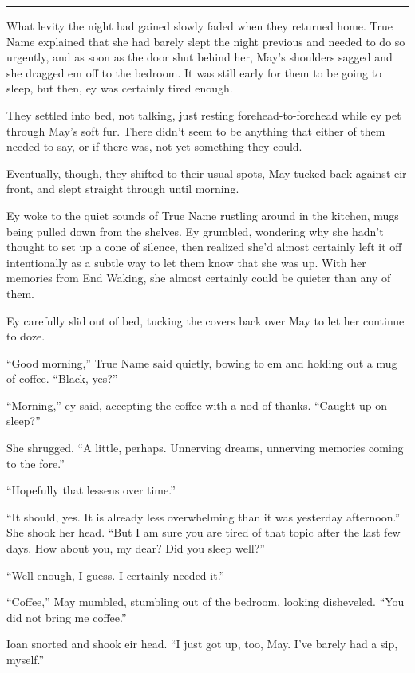 \begin{center}\rule{0.5\linewidth}{0.5pt}\end{center}

What levity the night had gained slowly faded when they returned home. True Name explained that she had barely slept the night previous and needed to do so urgently, and as soon as the door shut behind her, May's shoulders sagged and she dragged em off to the bedroom. It was still early for them to be going to sleep, but then, ey was certainly tired enough.

They settled into bed, not talking, just resting forehead-to-forehead while ey pet through May's soft fur. There didn't seem to be anything that either of them needed to say, or if there was, not yet something they could.

Eventually, though, they shifted to their usual spots, May tucked back against eir front, and slept straight through until morning.

Ey woke to the quiet sounds of True Name rustling around in the kitchen, mugs being pulled down from the shelves. Ey grumbled, wondering why she hadn't thought to set up a cone of silence, then realized she'd almost certainly left it off intentionally as a subtle way to let them know that she was up. With her memories from End Waking, she almost certainly could be quieter than any of them.

Ey carefully slid out of bed, tucking the covers back over May to let her continue to doze.

``Good morning,'' True Name said quietly, bowing to em and holding out a mug of coffee. ``Black, yes?''

``Morning,'' ey said, accepting the coffee with a nod of thanks. ``Caught up on sleep?''

She shrugged. ``A little, perhaps. Unnerving dreams, unnerving memories coming to the fore.''

``Hopefully that lessens over time.''

``It should, yes. It is already less overwhelming than it was yesterday afternoon.'' She shook her head. ``But I am sure you are tired of that topic after the last few days. How about you, my dear? Did you sleep well?''

``Well enough, I guess. I certainly needed it.''

``Coffee,'' May mumbled, stumbling out of the bedroom, looking disheveled. ``You did not bring me coffee.''

Ioan snorted and shook eir head. ``I just got up, too, May. I've barely had a sip, myself.''


